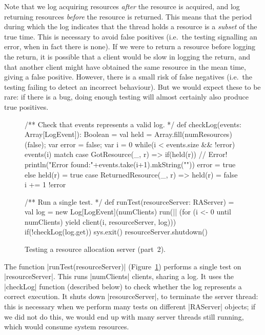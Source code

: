 
Note that we log acquiring resources \emph{after} the resource is acquired,
and log returning resources \emph{before} the resource is returned.  This
means that the period during which the log indicates that the thread holds a
resource is a \emph{subset} of the true time.
%
This is necessary to avoid false positives (i.e.~the testing signalling an
error, when in fact there is none).  If we were to return a resource before
logging the return, it is possible that a client would be slow in logging the
return, and that another client might have obtained the same resource in the
mean time, giving a false positive.
%
However, there is a small risk of false negatives (i.e.~the testing failing to
detect an incorrect behaviour).  But we would expect these to be rare: if
there is a bug, doing enough testing will almost certainly also produce true
positives.



\begin{figure}
\begin{scala}
  /** Check that events represents a valid log.  */
  def checkLog(events: Array[LogEvent]): Boolean = {
    val held = Array.fill(numResources)(false); var error = false; var i = 0
    while(i < events.size && !error){
      events(i) match{
        case GotResource(_, r) =>
          if(held(r)){ // Error!
            println("Error found:\n"+events.take(i+1).mkString("\n"))
            error = true
          }
          else held(r) = true
        case ReturnedResource(_, r) => held(r) = false
      }
      i += 1
    }
    !error
  }

  /** Run a single test. */
  def runTest(resourceServer: RAServer) = {
    val log = new Log[LogEvent](numClients)
    run(|| (for (i <- 0 until numClients) yield client(i, resourceServer, log)))
    if(!checkLog(log.get)) sys.exit()
    resourceServer.shutdown()
  }
\end{scala}
\caption{Testing a resource allocation server (part~2).}
\label{fig:RATest-2}
\end{figure}


The function |runTest(resourceServer)| (Figure~\ref{fig:RATest-2}) performs a
single test on |resourceServer|.  This runs |numClients| clients, sharing a
log.  It uses the |checkLog| function (described below) to check whether the
log represents a correct execution.  It shuts down |resourceServer|, to
terminate the server thread: this is necessary when we perform many tests on
different |RAServer| objects; if we did not do this, we would end up with many
server threads still running, which would consume system resources.

